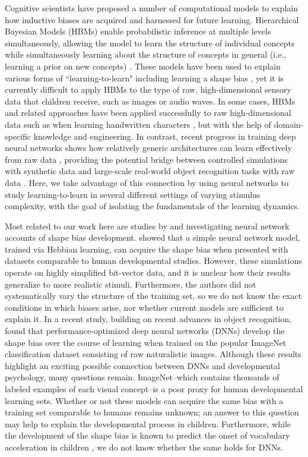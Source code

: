 Cognitive scientists have proposed a number of computational models to explain
how inductive biases are acquired and harnessed for future learning.
Hierarchical Bayesian Models (HBMs) enable probabilistic inference at multiple
levels simultaneously, allowing the model to learn the structure of individual
concepts while simultaneously learning about the structure of concepts in
general (i.e., learning a prior on new concepts)
\citep{Kemp2007, Salakhutdinov2012}. These models have been used to
explain various forms of ``learning-to-learn" including learning a shape bias
\citep{Kemp2007}, yet it is currently difficult to apply HBMs to the type of
raw, high-dimensional sensory data that children receive, such as images or
audio waves. In some cases, HBMs and related approaches have been applied
successfully to raw high-dimensional data such as when learning handwritten
characters \citep{Lake2015}, but with the help of domain-specific knowledge and
engineering. In contrast, recent progress in training deep neural networks
shows how relatively generic architectures can learn effectively from raw data
\citep{LeCun2015}, providing the potential bridge between controlled simulations
with synthetic data \citep[e.g.,][]{Colunga2005} and large-scale real-world
object recognition tasks with raw data \citep[e.g.,][]{Ritter2017}. Here, we
take advantage of this connection by using neural networks to study
learning-to-learn in several different settings of varying stimulus complexity,
with the goal of isolating the fundamentals of the learning dynamics.

Most related to our work here are studies by \cite{Colunga2005} and
\cite{Ritter2017} investigating neural network accounts of shape bias
development. \cite{Colunga2005} showed that a simple neural network model,
trained via Hebbian learning, can acquire the shape bias when presented with
datasets comparable to human developmental studies. However, these simulations
operate on highly simplified bit-vector data, and it is unclear how their
results generalize to more realistic stimuli. Furthermore, the authors did not
systematically vary the structure of the training set, so we do not know the
exact conditions in which biases arise, nor whether current models are
sufficient to explain it. In a recent study, building on recent advances in
object recognition, \cite{Ritter2017} found that performance-optimized deep
neural networks (DNNs) develop the shape bias over the course of learning when
trained on the popular ImageNet classification dataset consisting of raw
naturalistic images. Although these results highlight an exciting possible
connection between DNNs and developmental psychology, many questions remain.
ImageNet--which contains thousands of labeled examples of each visual
concept--is a poor proxy for human developmental learning sets. Whether or not
these models can acquire the same bias with a training set comparable to humans
remains unknown; an answer to this question may help to explain the
developmental process in children. Furthermore, while the development of the
shape bias is known to predict the onset of vocabulary acceleration in children
\citep{GershkoffStowe2004}, we do not know whether the same holds for DNNs.

